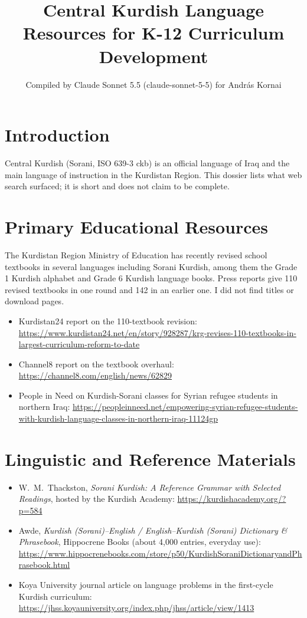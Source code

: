 \documentclass[12pt]{article}
\title{Central Kurdish Language Resources for K-12 Curriculum Development}
\author{Compiled by Claude Sonnet 5.5 (claude-sonnet-5-5) for Andr\'as Kornai}
\date{}
\begin{document}
\maketitle

\section{Introduction}
Central Kurdish (Sorani, ISO 639-3 ckb) is an official language of Iraq and the main language of instruction in the Kurdistan Region. This dossier lists what web search surfaced; it is short and does not claim to be complete.

\section{Primary Educational Resources}
The Kurdistan Region Ministry of Education has recently revised school textbooks in several languages including Sorani Kurdish, among them the Grade 1 Kurdish alphabet and Grade 6 Kurdish language books. Press reports give 110 revised textbooks in one round and 142 in an earlier one. I did not find titles or download pages.
\begin{itemize}
\item Kurdistan24 report on the 110-textbook revision: \url{https://www.kurdistan24.net/en/story/928287/krg-revises-110-textbooks-in-largest-curriculum-reform-to-date}
\item Channel8 report on the textbook overhaul: \url{https://channel8.com/english/news/62829}
\item People in Need on Kurdish-Sorani classes for Syrian refugee students in northern Iraq: \url{https://peopleinneed.net/empowering-syrian-refugee-students-with-kurdish-language-classes-in-northern-iraq-11124gp}
\end{itemize}

\section{Linguistic and Reference Materials}
\begin{itemize}
\item W.\ M.\ Thackston, \emph{Sorani Kurdish: A Reference Grammar with Selected Readings}, hosted by the Kurdish Academy: \url{https://kurdishacademy.org/?p=584}
\item Awde, \emph{Kurdish (Sorani)--English / English--Kurdish (Sorani) Dictionary \& Phrasebook}, Hippocrene Books (about 4,000 entries, everyday use): \url{https://www.hippocrenebooks.com/store/p50/KurdishSoraniDictionaryandPhrasebook.html}
\item Koya University journal article on language problems in the first-cycle Kurdish curriculum: \url{https://jhss.koyauniversity.org/index.php/jhss/article/view/1413}
\end{itemize}
\end{document}
